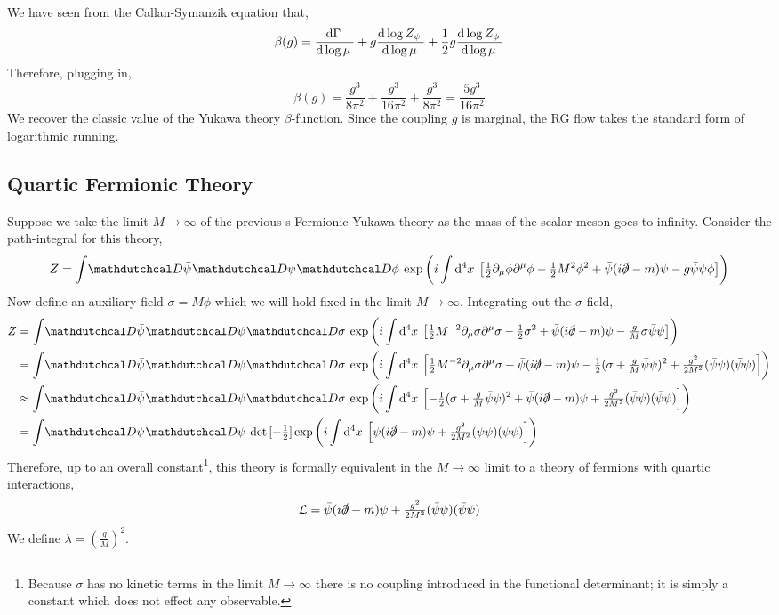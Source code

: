\documentclass[12pt]{article}
\begin{document}
We have seen from the Callan-Symanzik equation that,
\[ \beta(g) = \frac{\mathrm{d}\Gamma \:}{\mathrm{d}\log{\mu} \:} + g \frac{\mathrm{d}\log{Z_{\psi}} \:}{\mathrm{d}\log{\mu} \:} + \frac{1}{2} g \frac{\mathrm{d}\log{Z_{\phi}} \:}{\mathrm{d}\log{\mu} \:} \]
Therefore, plugging in,
\[ \beta(g) = \frac{g^3}{8\pi^2} + \frac{g^3}{16 \pi^2} + \frac{g^3}{8 \pi^2} = \frac{5 g^3}{16\pi^2} 
\]
We recover the classic value of the Yukawa theory $\beta$-function. Since the coupling $g$ is marginal, the RG flow takes the standard form of logarithmic running.  

\subsection{Quartic Fermionic Theory} 

Suppose we take the limit $M \to \infty$ of the previous s Fermionic Yukawa theory as the mass of the scalar meson goes to infinity. Consider the path-integral for this theory,
\[ Z = \int \pathd{\bar{\psi}} \pathd{\psi} \pathd{\phi} \exp{\left( i \int \dn{4}{x} \left[ \tfrac{1}{2} \partial_\mu \phi \partial^\mu \phi - \tfrac{1}{2} M^2 \phi^2 + \bar{\psi} (i \slashed{\partial} - m)\psi - g \bar{\psi} \psi \phi  \right] \right)} \]
Now define an auxiliary field $\sigma = M \phi$ which we will hold fixed in the limit $M \to \infty$. Integrating out the $\sigma$ field,
\begin{align*}
Z & = \int \pathd{\bar{\psi}} \pathd{\psi} \pathd{\sigma} \exp{\left( i \int \dn{4}{x} \left[ \tfrac{1}{2} M^{-2} \partial_\mu \sigma \partial^\mu \sigma - \tfrac{1}{2} \sigma^2 + \bar{\psi} (i \slashed{\partial} - m)\psi - \tfrac{g}{M} \sigma \bar{\psi} \psi   \right] \right)}
\\
& = \int \pathd{\bar{\psi}} \pathd{\psi} \pathd{\sigma} \exp{\left( i \int \dn{4}{x} \left[ \tfrac{1}{2} M^{-2} \partial_\mu \sigma \partial^\mu \sigma + \bar{\psi} (i \slashed{\partial} - m)\psi - \tfrac{1}{2} (\sigma + \tfrac{g}{M} \bar{\psi} \psi)^2 + \tfrac{g^2}{2M^2} (\bar{\psi} \psi)(\bar{\psi} \psi) \right] \right)}
\\
& \approx \int \pathd{\bar{\psi}} \pathd{\psi} \pathd{\sigma} \exp{\left( i \int \dn{4}{x} \left[ - \tfrac{1}{2} (\sigma + \tfrac{g}{M} \bar{\psi} \psi)^2 + \bar{\psi} (i \slashed{\partial} - m)\psi + \tfrac{g^2}{2M^2} (\bar{\psi} \psi)(\bar{\psi} \psi) \right] \right)}
\\
& = \int \pathd{\bar{\psi}} \pathd{\psi} \det{[-\tfrac{1}{2}]} \exp{\left( i \int \dn{4}{x} \left[ \bar{\psi} (i \slashed{\partial} - m)\psi + \tfrac{g^2}{2M^2} (\bar{\psi} \psi) (\bar{\psi} \psi)   \right] \right)}
\end{align*}
Therefore, up to an overall constant\footnote{Because $\sigma$ has no kinetic terms in the limit $M \to \infty$ there is no coupling introduced in the functional determinant; it is simply a constant which does not effect any observable.}, this theory is formally equivalent in the $M \to \infty$ limit to a theory of fermions with quartic interactions,
\[ \mathcal{L} = \bar{\psi} (i \slashed{\partial} - m)\psi + \tfrac{g^2}{2M^2} (\bar{\psi} \psi) (\bar{\psi} \psi)  \]
We define $\lambda = \left(\frac{g}{M}\right)^2$. 
\end{document}
